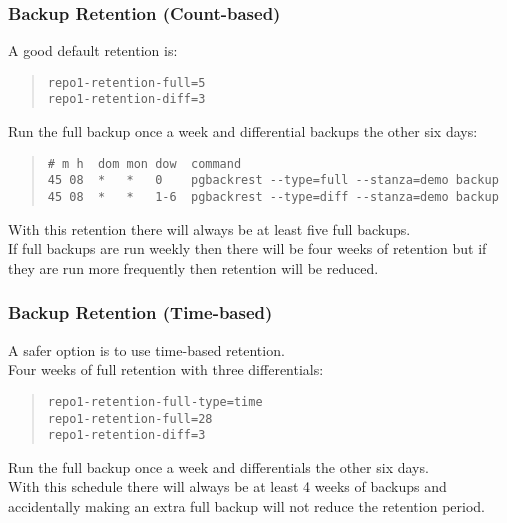\begin{frame}[fragile]
    \frametitle{Backup Retention (Count-based)}

    A good default retention is:

    \begin{quote}\begin{verbatim}
repo1-retention-full=5
repo1-retention-diff=3
    \end{verbatim}\end{quote}\vspace{-1em}

    Run the full backup once a week and differential backups the other six days:

    \begin{quote}\begin{verbatim}
# m h  dom mon dow  command
45 08  *   *   0    pgbackrest --type=full --stanza=demo backup
45 08  *   *   1-6  pgbackrest --type=diff --stanza=demo backup
    \end{verbatim}\end{quote}\vspace{-1em}

    With this retention there will always be at least five full backups.
    \\\vspace{1em}
    If full backups are run weekly then there will be four weeks of retention but if they are run more frequently then retention will be reduced.
\end{frame}

\begin{frame}[fragile]
    \frametitle{Backup Retention (Time-based)}

    A safer option is to use time-based retention.
    \\\vspace{1em}
    Four weeks of full retention with three differentials:

    \begin{quote}\begin{verbatim}
repo1-retention-full-type=time
repo1-retention-full=28
repo1-retention-diff=3
    \end{verbatim}\end{quote}\vspace{-1em}

    Run the full backup once a week and differentials the other six days.
    \\\vspace{1em}
    With this schedule there will always be at least 4 weeks of backups and accidentally making an extra full backup will not reduce the retention period.
\end{frame}

